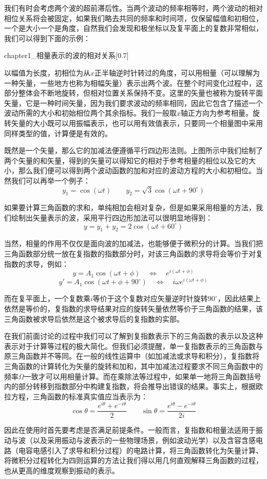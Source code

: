 我们有时会考虑两个波的超前滞后性。当两个波动的频率相等时，两个波动的相对相位关系将会被固定，如果我们略去共同的频率和时间项，仅保留幅值和初相位，一个是大小一个是角度，自然我们会发现和极坐标以及复平面上的复数非常相似，我们可以得到下面的示例：
\begin{singlefigure}[相量表示的波的相对关系]{chapter1_相量表示的波的相对关系}[0.7]
\end{singlefigure}

以幅值为长度，初相位为从$x$正半轴逆时针转过的角度，可以用相量（可以理解为一种矢量，一些地方也称为相幅矢量）表示出两个波。在整个时间变化过程中，这部分整体会不断地旋转，但相对位置关系保持不变。这里的矢量也被称为旋转平面矢量，它是一种时间矢量，因为我们要求波动的频率相同，因此它包含了描述一个波动所需的大小和初始相位两个其余指标。我们一般取$x$轴正方向为参考相量。旋转矢量的大小既可以用振幅表示，也可以用有效值表示，只要同一个相量图中采用同样类型的值，计算便是有效的。

既然是一个矢量，那么它的加减法便遵循平行四边形法则。上图所示中我们绘制了两个矢量的和矢量，得到的矢量可以得知它的相对于参考相量的相位以及它的大小，那么我们便可以得到两个波动函数的加和对应的波动方程的大小和初相位。当然我们可以再举一个例子：
\[y_1 = \cos(\omega t)\qquad y_2 = \sqrt{3}\cos(\omega t+90^\circ)\]

如果要计算三角函数的求和，单纯相加会相对复杂，但是如果采用相量的方法，我们绘制出矢量表示的波，采用平行四边形加法可以很明显地得到：
\[y = y_1 + y_2 = 2\cos(\omega t + 60^\circ)\]

当然，相量的作用不仅仅是面向波的加减法，也能够便于微积分的计算。当我们把三角函数部分统一放在复指数的指数部分时，对该三角函数的求导将会等价于对复指数的求导，例如：
\[y = A_1\cos(\omega t + \phi)\quad\Leftrightarrow\quad e^{i(\omega t + \phi)}\]
\[y' = A_1\cos(\omega t + \phi + 90^\circ)\quad\Leftrightarrow\quad i\omega e^{i(\omega t + \phi)}\]

而在复平面上，一个复数乘$i$等价于这个复数对应矢量逆时针旋转$90^\circ$，因此结果上依然是等价的，复指数的求导结果对应的旋转矢量依然等价于三角函数的结果，该三角函数被求导后依然是这个被求导后的复指数的实部。

在我们前面讨论的过程中我们可以了解到复指数表示下的三角函数的表示以及这种表示对于计算等过程的极大简化。但我们必须提醒，单一复指数表示的三角函数与原三角函数并不等同。在一般的线性运算中（如加减法或求导和积分），复指数将三角函数的计算转化为矢量的旋转和加和，其中加减法过程要求不同三角函数中的频率$\Omega$一致才可以用相量计算。而在乘除法等过程中，如果单一地将三角函数括号内的部分转移到指数部分中构建复指数，将会推导出错误的结果。事实上，根据欧拉方程，三角函数的标准真实值应当表示为：
\[\cos\theta = \dfrac{e^{i\theta} + e^{-i\theta}}{2}\qquad \sin\theta = \dfrac{e^{i\theta} - e^{-i\theta}}{2i}\]

因此在使用时首先要考虑是否满足前提条件。一般而言，复指数和相量法适用于振动与波（以及采用振动与波表示的一些物理场景，例如波动光学）以及含容含感电路（电容电感引入了求导和积分过程）的电路计算，将三角函数转化为矢量计算、将微积分过程转化为四则运算的方法让我们得以用几何直观解释三角函数的过程，也从更高的维度观察到振动的表示。